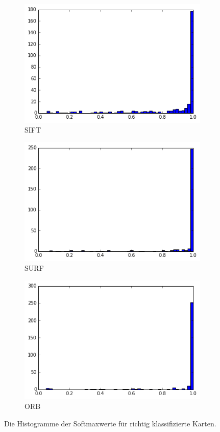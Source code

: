 \begin{figure}
\begin{subfigure}{.5\textwidth}
  \centering
  \includegraphics[width=.8\linewidth]{bilder/confidenceSift.png}
  \caption{SIFT}
  \label{fig:sfig1}
\end{subfigure}%
\begin{subfigure}{.5\textwidth}
  \centering
  \includegraphics[width=.8\linewidth]{bilder/confidenceSurf.png}
  \caption{SURF}
  \label{fig:sfig2}
\end{subfigure}
\begin{subfigure}{.5\textwidth}
  \centering
  \includegraphics[width=.8\linewidth]{bilder/confidenceOrb.png}
  \caption{ORB}
  \label{fig:sfig2}
\end{subfigure}
\caption{Die Histogramme der Softmaxwerte für richtig klassifizierte Karten.}
\label{fig:hist}
\end{figure}

